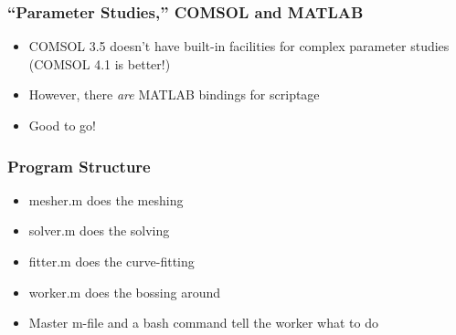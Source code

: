 \documentclass{beamer}
\begin{document}
\begin{frame}
\frametitle{``Parameter Studies,'' COMSOL and MATLAB}
\begin{itemize}
\item COMSOL 3.5 doesn't have built-in facilities for complex parameter studies
(COMSOL 4.1 is better!)
\item However, there \emph{are} MATLAB bindings for scriptage
\item Good to go!
\end{itemize}
\end{frame}


\begin{frame}
\frametitle{Program Structure}
\begin{itemize}
\item mesher.m does the meshing
\item solver.m does the solving
\item fitter.m does the curve-fitting
\item worker.m does the bossing around
\item Master m-file and a bash command tell the worker what to do
\end{itemize}
\end{frame}
\end{document}
